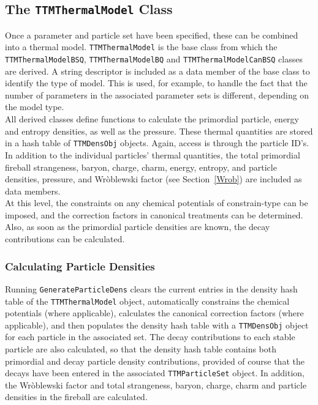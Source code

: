 \documentclass{elsarticle}
\begin{document}
\subsection{The \texttt{TTMThermalModel} Class}

Once a parameter and particle set have been specified, these can be 
combined into a thermal model. \texttt{TTMThermalModel} is the base class from which the 
\texttt{TTMThermalModelBSQ}, \texttt{TTMThermalModelBQ} and
\texttt{TTMThermalModelCanBSQ}\linebreak
classes are derived. A string descriptor is included as a data member of the base class 
to identify the type of model. This is used, for example, 
to handle the fact that the number of parameters in the associated parameter 
sets is different, depending on the model type.\\ 

All derived classes define functions 
to calculate the primordial particle, energy and entropy 
densities, as well as the pressure. These thermal quantities are stored in a hash table of \texttt{TTMDensObj} 
objects. Again, access is through the particle ID's. In addition to the individual particles' 
thermal quantities, the total primordial fireball strangeness, baryon, charge, charm, energy, entropy, 
and particle densities, pressure, and Wr\`oblewski factor (see Section~\ref{Wrob}) are included as data members.\\ 

At this level, the constraints on any chemical potentials of constrain-type can be imposed, and the 
correction factors in canonical treatments can be determined. Also, as soon as the 
primordial particle densities are known, the decay contributions can be calculated.\\ 

\subsubsection{Calculating Particle Densities}

Running \texttt{GenerateParticleDens} clears the current entries in the density hash table of the 
\texttt{TTMThermalModel} object, automatically constrains the chemical potentials (where applicable), 
calculates the canonical correction factors (where applicable), and then populates the density 
hash table with a \texttt{TTMDensObj} object for each particle in the associated set. 
The decay contributions to 
each stable particle are also calculated, so that the density hash table contains both primordial and 
decay particle density contributions, provided of course that the decays have been entered in the associated 
\texttt{TTMParticleSet} object. In addition, the 
Wr\`oblewski factor and total strangeness, baryon, charge, charm and particle densities in the fireball 
are calculated.\\ 
\end{document}
